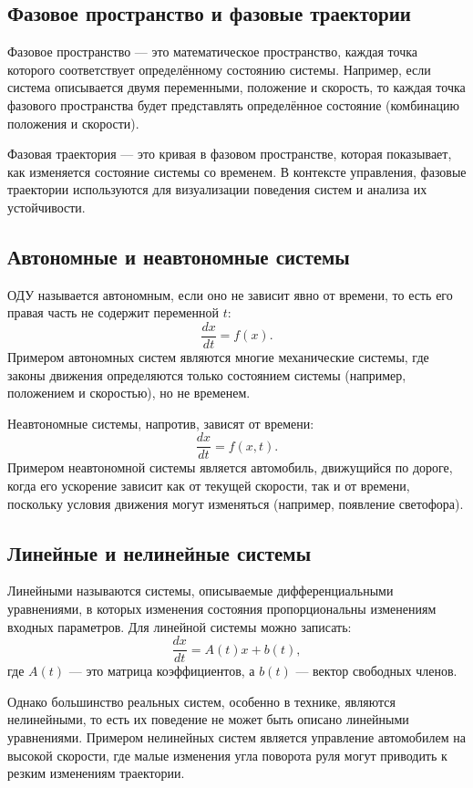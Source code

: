 \documentclass[a4paper,14pt]{extarticle} %
\begin{document}
\subsection{Фазовое пространство и фазовые траектории}
Фазовое пространство — это математическое пространство, каждая точка которого соответствует определённому состоянию системы. Например, если система описывается двумя переменными, положение и скорость, то каждая точка фазового пространства будет представлять определённое состояние (комбинацию положения и скорости).

Фазовая траектория — это кривая в фазовом пространстве, которая показывает, как изменяется состояние системы со временем. В контексте управления, фазовые траектории используются для визуализации поведения систем и анализа их устойчивости.

\subsection{Автономные и неавтономные системы}
ОДУ называется автономным, если оно не зависит явно от времени, то есть его правая часть не содержит переменной \(t\):
\[
\frac{dx}{dt} = f(x).
\]
Примером автономных систем являются многие механические системы, где законы движения определяются только состоянием системы (например, положением и скоростью), но не временем.

Неавтономные системы, напротив, зависят от времени:
\[
\frac{dx}{dt} = f(x, t).
\]
Примером неавтономной системы является автомобиль, движущийся по дороге, когда его ускорение зависит как от текущей скорости, так и от времени, поскольку условия движения могут изменяться (например, появление светофора).

\subsection{Линейные и нелинейные системы}
Линейными называются системы, описываемые дифференциальными уравнениями, в которых изменения состояния пропорциональны изменениям входных параметров. Для линейной системы можно записать:
\[
\frac{dx}{dt} = A(t)x + b(t),
\]
где \(A(t)\) — это матрица коэффициентов, а \(b(t)\) — вектор свободных членов.

Однако большинство реальных систем, особенно в технике, являются нелинейными, то есть их поведение не может быть описано линейными уравнениями. Примером нелинейных систем является управление автомобилем на высокой скорости, где малые изменения угла поворота руля могут приводить к резким изменениям траектории.
\end{document}
